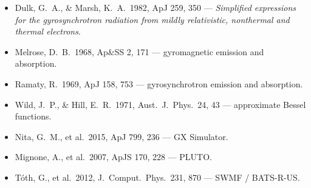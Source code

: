 \begin{itemize}[itemsep=2pt]
\item Dulk, G.\ A., \& Marsh, K.\ A.\ 1982, ApJ 259, 350 --- \emph{Simplified expressions for the gyrosynchrotron radiation from mildly relativistic, nonthermal and thermal electrons}.
\item Melrose, D.\ B.\ 1968, Ap\&SS 2, 171 --- gyromagnetic emission and absorption.
\item Ramaty, R.\ 1969, ApJ 158, 753 --- gyrosynchrotron emission and absorption.
\item Wild, J.\ P., \& Hill, E.\ R.\ 1971, Aust.\ J.\ Phys.\ 24, 43 --- approximate Bessel functions.
\item Nita, G.\ M., et al.\ 2015, ApJ 799, 236 --- GX Simulator.
\item Mignone, A., et al.\ 2007, ApJS 170, 228 --- PLUTO.
\item T\'oth, G., et al.\ 2012, J.\ Comput.\ Phys.\ 231, 870 --- SWMF / BATS-R-US.
\end{itemize}
